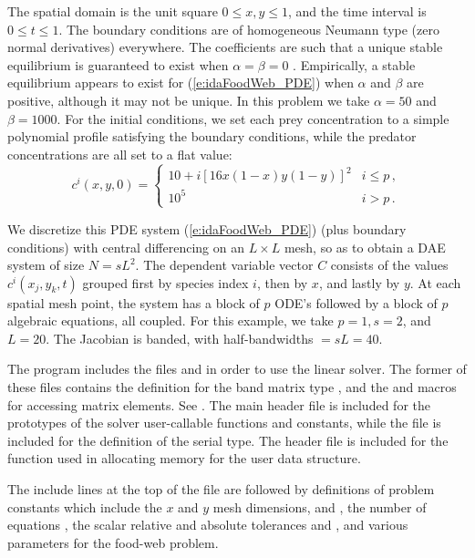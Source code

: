The spatial domain is the unit square $0 \leq x,y \leq 1$, and the
time interval is $0 \leq t \leq 1$.  The boundary conditions are of
homogeneous Neumann type (zero normal derivatives) everywhere.  
The coefficients
are such that a unique stable equilibrium is guaranteed to exist when
$\alpha = \beta = 0$ \cite{Bro:86}.  Empirically, a stable equilibrium
appears to exist for (\ref{e:idaFoodWeb_PDE}) when $\alpha$ and $\beta$ are
positive, although it may not be unique. In this problem we take
$\alpha = 50$ and $\beta = 1000$.  For the initial conditions, we set
each prey concentration to a simple polynomial profile satisfying the
boundary conditions, while the predator concentrations are all set to
a flat value:
\begin{equation*}
c^i(x,y,0) = 
\begin{cases}
  10 + i [16x(1 - x)y(1 - y)]^2 & i \leq p \, , \\
  10^5                          & i > p \, .
\end{cases}
\end{equation*}

We discretize this PDE system (\ref{e:idaFoodWeb_PDE}) (plus boundary conditions)
with central differencing on an $L \times L$ mesh, so as to obtain a
DAE system of size $N = s L^2$.  The dependent variable vector $C$
consists of the values $c^i(x_j,y_k,t)$ grouped first by species index
$i$, then by $x$, and lastly by $y$.  At each spatial mesh point, the
system has a block of $p$ ODE's followed by a block of $p$ algebraic
equations, all coupled.
For this example, we take $p = 1, s = 2$, and $L = 20$.
The Jacobian is banded, with half-bandwidths  $= sL = 40$.

The  program includes the files
 and  in order
to use the {\sunlinsolband} linear solver. 
The former of these files contains the definition for the band matrix
type {\sunmatband}, and the  and
 macros for accessing matrix elements. See
. 
The main {\ida} header file  is included for the prototypes of the
solver user-callable functions and {\ida} constants, while the file
 is included for the definition of the serial
 type.  The header file  is included for the
 function used in allocating memory for the user data structure.

The include lines at the top of the file are followed by definitions of
problem constants which include the $x$ and $y$ mesh dimensions,  and
, the number of equations , the scalar relative and absolute
tolerances  and , and various parameters for the food-web problem.

